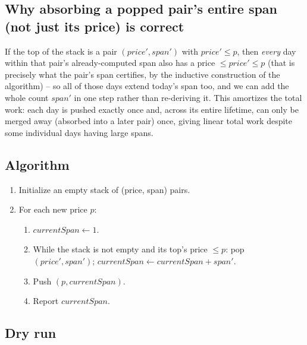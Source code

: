 \subsection*{Why absorbing a popped pair's entire span (not just its price) is correct}

If the top of the stack is a pair $(\textit{price}', \textit{span}')$
with $\textit{price}' \le p$, then \emph{every} day within that pair's
already-computed span also has a price $\le \textit{price}' \le p$ (that
is precisely what the pair's span certifies, by the inductive
construction of the algorithm) -- so all of those days extend today's
span too, and we can add the whole count $\textit{span}'$ in one step
rather than re-deriving it. This amortizes the total work: each day is
pushed exactly once and, across its entire lifetime, can only be merged
away (absorbed into a later pair) once, giving linear total work despite
some individual days having large spans.

\subsection*{Algorithm}

\begin{enumerate}
  \item Initialize an empty stack of (price, span) pairs.
  \item For each new price $p$:
  \begin{enumerate}
    \item $\textit{currentSpan} \gets 1$.
    \item While the stack is not empty and its top's price $\le p$: pop
          $(\textit{price}', \textit{span}')$;
          $\textit{currentSpan} \gets \textit{currentSpan} +
          \textit{span}'$.
    \item Push $(p, \textit{currentSpan})$.
    \item Report $\textit{currentSpan}$.
  \end{enumerate}
\end{enumerate}

\subsection*{Dry run}


